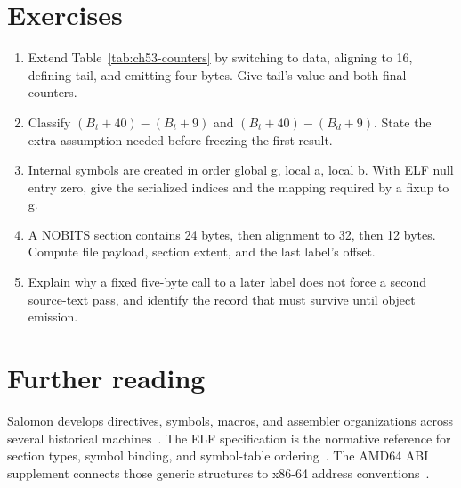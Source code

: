 \section{Exercises}
\label{sec:ch53-exercises}
\begin{enumerate}
\item\label{ex:ch53-counter} Extend Table~\ref{tab:ch53-counters} by switching to data, aligning to 16, defining tail, and emitting four bytes. Give tail's value and both final counters.
\item\label{ex:ch53-expression} Classify $(B_t+40)-(B_t+9)$ and $(B_t+40)-(B_d+9)$. State the extra assumption needed before freezing the first result.
\item\label{ex:ch53-symbol-index} Internal symbols are created in order global g, local a, local b. With ELF null entry zero, give the serialized indices and the mapping required by a fixup to g.
\item\label{ex:ch53-nobits} A NOBITS section contains 24 bytes, then alignment to 32, then 12 bytes. Compute file payload, section extent, and the last label's offset.
\item\label{ex:ch53-forward} Explain why a fixed five-byte call to a later label does not force a second source-text pass, and identify the record that must survive until object emission.
\end{enumerate}

\section{Further reading}
\label{sec:ch53-reading}
Salomon develops directives, symbols, macros, and assembler organizations across several historical machines~\cite{salomon-1993-assemblers}.
The ELF specification is the normative reference for section types, symbol binding, and symbol-table ordering~\cite{xinuos-2026-elf}.
The AMD64 ABI supplement connects those generic structures to x86-64 address conventions~\cite{matz-2012-amd64}.
